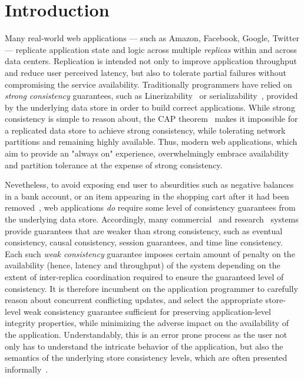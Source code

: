 \section{Introduction}

Many real-world web applications --- such as Amazon, Facebook, Google, Twitter
--- replicate application state and logic across multiple \emph{replicas} within
and across data centers. Replication is intended not only to improve application
throughput and reduce user perceived latency, but also to tolerate partial
failures without compromising the service availability. Traditionally
programmers have relied on \emph{strong consistency} guarantees, such as
Linerizability~\cite{Herlihy1990} or serializability~\cite{Serializability},
provided by the underlying data store in order to build correct applications.
While strong consistency is simple to reason about, the CAP
theorem~\cite{Brewer2000,Gilbert} makes it impossible for a replicated data
store to achieve strong consistency, while tolerating network partitions and
remaining highly available. Thus, modern web applications, which aim to provide
an "always on" experience, overwhelmingly embrace availability and partition
tolerance at the expense of strong consistency. 

Nevetheless, to avoid exposing end user to absurdities such as negative balances
in a bank account, or an item appearing in the shopping cart after it had been
removed~\cite{Dynamo}, web applications \emph{do} require some level of
consistency guarantees from the underlying data store. Accordingly, many
commercial~\cite{} and research~\cite{} systems provide guarantees that are
weaker than strong consistency, such as eventual consistency, causal
consistency, session guarantees, and time line consistency. Each such \emph{weak
consistency} guarantee imposes certain amount of penalty on the availability
(hence, latency and throughput) of the system depending on the extent of
inter-replica coordination required to ensure the guaranteed level of
consistency. It is therefore incumbent on the application programmer to
carefully reason about concurrent conflicting updates, and select the
appropriate store-level weak consistency guarantee sufficient for preserving
application-level integrity properties, while minimizing the adverse impact on
the availability of the application. Understandably, this is an error prone
process as the user not only has to understand the intricate behavior of the
application, but also the semantics of the underlying store consistency levels,
which are often presented informally~\cite{}.

